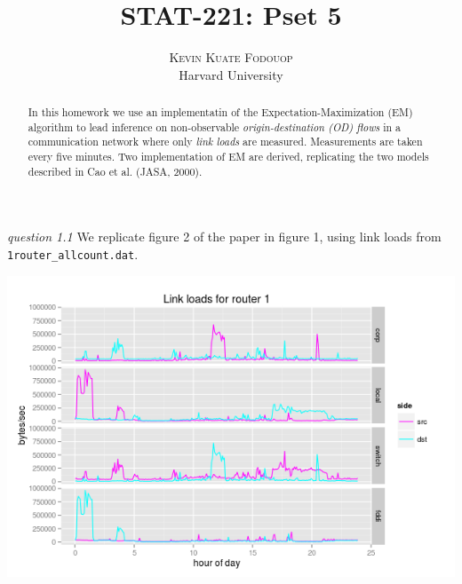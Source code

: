 \documentclass[twoside]{article}
\title{\vspace{-15mm}\fontsize{24pt}{10pt}\selectfont\textbf{STAT-221: Pset 5}} %
\author{
\large
\textsc{Kevin Kuate Fodouop}\\ %
\normalsize Harvard University \\ %
\vspace{-5mm}
}
\date{}
\begin{document}
\maketitle %

\thispagestyle{fancy} %


\begin{abstract}
In this homework we use an implementatin of the Expectation-Maximization (EM) algorithm to lead inference on non-observable \textit{ origin-destination (OD) flows} in a communication network where only \textit{link loads} are measured. Measurements are taken every five minutes. Two implementation of EM are derived, replicating the two models described in Cao et al. (JASA, 2000).

\end{abstract}




\textit{question 1.1} We replicate figure 2 of the paper in figure 1, using link loads from \texttt{1router\_allcount.dat}.

\begingroup
\centering
\includegraphics[scale=0.50]{./img/linkload_rout1.png}
\endgroup
\end{document}
